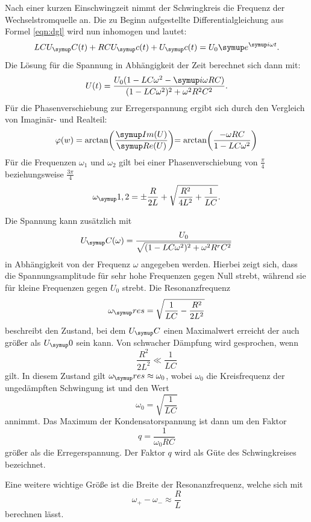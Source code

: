 Nach einer kurzen Einschwingzeit nimmt der Schwingkreis die Frequenz der
Wechselstromquelle an. Die zu Beginn aufgestellte Differentialgleichung aus
Formel \eqref{eqn:dgl} wird nun inhomogen und lautet:
\begin{equation}
  LCU_\su{C}(t) + RCU_\su{c}(t) + U_\su{c}(t) =U_0\su{e}^{\su{i}\omega t}.
  \label{eqn:inh}
\end{equation}
Die Lösung für die Spannung in Abhängigkeit der Zeit berechnet sich dann mit:
\begin{equation}
  U(t)=\frac{U_0(1-LC\omega^2-\su{i}\omega RC)}{(1-LC\omega^2)^2+\omega^2 R^2 C^2}.
\end{equation}
Für die Phasenverschiebung zur Erregerspannung ergibt sich durch den Vergleich
von Imaginär- und Realteil: %
\begin{equation}
  \varphi(w)=\arctan\biggr(\frac{\su{Im}(U)}{\su{Re}(U)}\biggl)
  =\arctan\biggr(\frac{-\omega RC}{1-LC\omega^2}\biggl)
\end{equation}
Für die Frequenzen $\omega_1$ und $\omega_2$ gilt bei einer Phasenverschiebung
von $\frac{\pi}{4}$ beziehungsweise $\frac{3\pi}{4}$
\begin{equation}
  \omega_\su{1,2}=\pm\frac{R}{2L}+\sqrt{\frac{R^2}{4L^2}+\frac{1}{LC}}.
  \label{eqn:w12}
\end{equation}

Die Spannung kann zusätzlich mit
\begin{equation}
  U_\su{C}(\omega)=\frac{U_0}{\sqrt{(1-LC\omega^2)^2+\omega^2R^rC^2}}
\end{equation}
in Abhängigkeit von der Frequenz $\omega$ angegeben werden.
Hierbei zeigt sich, dass die Spannungsamplitude für sehr hohe Frequenzen gegen
Null strebt, während sie für kleine Frequenzen gegen $U_0$ strebt.
Die Resonanzfrequenz
\begin{equation}
  \omega_\su{res}=\sqrt{\frac{1}{LC}-\frac{R^2}{2L^2}} \label{eqn:wres}
\end{equation}
beschreibt den Zustand, bei dem $U_\su{C}$ einen Maximalwert erreicht der auch
größer als $U_\su{0}$ sein kann.
Von schwacher Dämpfung wird gesprochen, wenn
\begin{equation}
  \frac{R^2}{2L^2} \ll \frac{1}{LC}
\end{equation}
gilt. In diesem Zustand gilt $\omega_\su{res}\approx\omega_0$, wobei $\omega_0$
die Kreisfrequenz der ungedämpften Schwingung ist und den Wert
\begin{equation}
  \omega_0 =\sqrt{\frac{1}{LC}}
\end{equation}
annimmt. Das Maximum der Kondensatorspannung ist dann um den Faktor
\begin{equation}
  q=\frac{1}{\omega_0RC}
  \label{eqn:guete}
\end{equation}
größer als die Erregerspannung. Der Faktor $q$ wird als Güte des Schwingkreises
bezeichnet.

Eine weitere wichtige Größe ist die Breite der Resonanzfrequenz, welche sich mit
\begin{equation}
  \omega_+ - \omega_- \approx \frac{R}{L}
  \label{eqn:breite}
\end{equation}
berechnen lässt.

